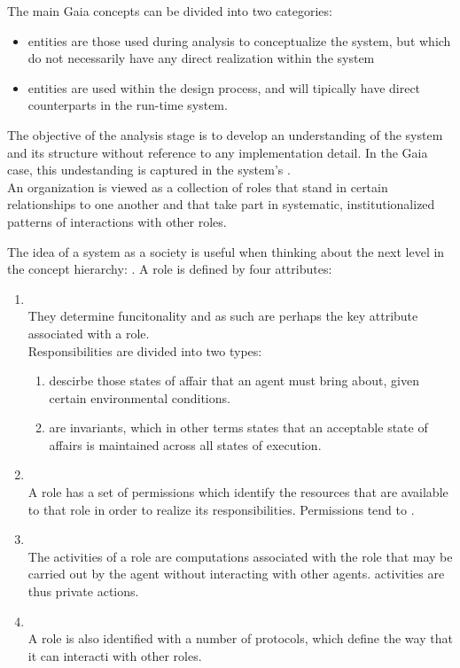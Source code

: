 The main Gaia concepts can be divided into two categories: 
\begin{itemize}
\item {} entities are those used during analysis to conceptualize the system, but which do not necessarily have any direct realization within the system
\item {} entities are used within the design process, and will tipically have direct counterparts in the run-time system.
\end{itemize}

The objective of the analysis stage is to develop an understanding of the system and its structure without reference to any implementation detail. In the Gaia case, this undestanding is captured in the system's .\\
An organization is viewed as a collection of roles that stand in certain relationships to one another and that take part in systematic, institutionalized patterns of interactions with other roles.

The idea of a system as a society is useful when thinking about the next level in the concept hierarchy: . A role is defined by four attributes: 
\begin{enumerate}
\item {}\\
They determine funcitonality and as such are perhaps the key attribute associated with a role.\\
Responsibilities are divided into two types:
\begin{enumerate}
\item {} descirbe those states of affair that an agent must bring about, given certain environmental conditions.
\item {} are invariants, which in other terms states that an acceptable state of affairs is maintained across all states of execution.
\end{enumerate}
\item {}\\
A role has a set of permissions which identify the resources that are available to that role in order to realize its responsibilities. Permissions tend to .
\item {}\\
The activities of a role are computations associated with the role that may be carried out by the agent without interacting with other agents. activities are thus private actions.
\item {}\\
A role is also identified with a number of protocols, which define the way that it can interacti with other roles.
\end{enumerate}

